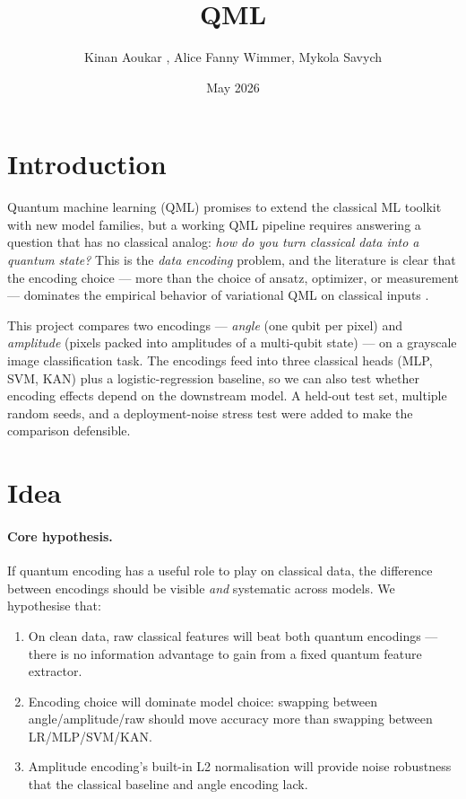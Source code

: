 \documentclass[11pt,a4paper]{article}
\title{\textbf{QML}}
\author{Kinan Aoukar , Alice Fanny Wimmer, Mykola Savych}
\date{May 2026}
\begin{document}
\maketitle

\section{Introduction}

Quantum machine learning (QML) promises to extend the classical ML toolkit
with new model families, but a working QML pipeline requires answering
a question that has no classical analog: \textit{how do you turn classical
data into a quantum state?} This is the \emph{data encoding} problem, and
the literature is clear that the encoding choice — more than the choice
of ansatz, optimizer, or measurement — dominates the empirical behavior
of variational QML on classical inputs \cite{schuld2021}.

This project compares two encodings — \emph{angle} (one qubit per pixel)
and \emph{amplitude} (pixels packed into amplitudes of a multi-qubit state) —
on a grayscale image classification task. The encodings feed into three
classical heads (MLP, SVM, KAN) plus a logistic-regression baseline, so we
can also test whether encoding effects depend on the downstream model.
A held-out test set, multiple random seeds, and a deployment-noise stress
test were added to make the comparison defensible.

\section{Idea}

\paragraph{Core hypothesis.} If quantum encoding has a useful role to play
on classical data, the difference between encodings should be visible
\emph{and} systematic across models. We hypothesise that:
\begin{enumerate}
    \item On clean data, raw classical features will beat both quantum
        encodings — there is no information advantage to gain from a fixed
        quantum feature extractor.
    \item Encoding choice will dominate model choice: swapping between
        angle/amplitude/raw should move accuracy more than swapping between
        LR/MLP/SVM/KAN.
    \item Amplitude encoding's built-in L2 normalisation will provide
        noise robustness that the classical baseline and angle encoding
        lack.
\end{enumerate}
\end{document}

